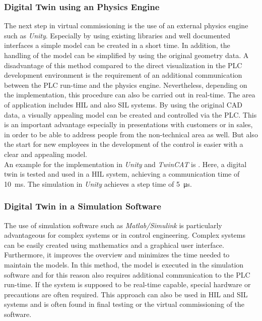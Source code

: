 \subsubsection{Digital Twin using an Physics Engine}		%
    The next step in virtual commissioning is the use of an external physics engine such as \textit{Unity}. Especially by using existing libraries and well documented interfaces a simple model can be created in a short time. In addition, the handling of the model can be simplified by using the original geometry data. A disadvantage of this method compared to the direct visualization in the PLC development environment is the requirement of an additional communication between the PLC run-time and the physics engine. Nevertheless, depending on the implementation, this procedure can also be carried out in real-time. The area of application includes \ac{HIL} and also \ac{SIL} systems. By using the original CAD data, a visually appealing model can be created and controlled via the PLC. This is an important advantage especially in presentations with customers or in sales, in order to be able to address people from the non-technical area as well. But also the start for new employees in the development of the control is easier with a clear and appealing model. \\
    
    An example for the implementation in \textit{Unity} and \textit{TwinCAT} is \cite{DigitalTwinUnityExample}. Here, a digital twin is tested and used in a \ac{HIL} system, achieving a communication time of \SI{10}{\milli\second}. The simulation in \textit{Unity} achieves a step time of \SI{5}{\micro\second}.

\subsubsection{Digital Twin in a Simulation Software}		%
	The use of simulation software such as \textit{Matlab/Simulink} is particularly advantageous for complex systems or in control engineering. Complex systems can be easily created using mathematics and a graphical user interface. Furthermore, it improves the overview and minimizes the time needed to maintain the models. In this method, the model is executed in the simulation software and for this reason also requires additional communication to the PLC run-time. If the system is supposed to be real-time capable, special hardware or precautions are often required. This approach can also be used in \ac{HIL} and \ac{SIL} systems and is often found in final testing or the virtual commissioning of the software. 

